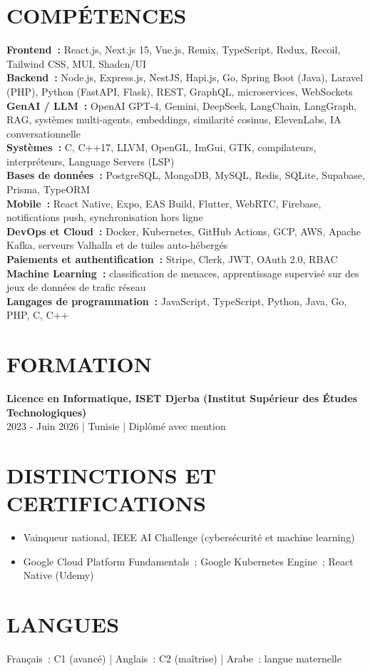 \section{COMPÉTENCES}
\textbf{Frontend~:} React.js, Next.js 15, Vue.js, Remix, TypeScript, Redux, Recoil, Tailwind CSS, MUI, Shadcn/UI\\
\textbf{Backend~:} Node.js, Express.js, NestJS, Hapi.js, Go, Spring Boot (Java), Laravel (PHP), Python (FastAPI, Flask), REST, GraphQL, microservices, WebSockets\\
\textbf{GenAI / LLM~:} OpenAI GPT-4, Gemini, DeepSeek, LangChain, LangGraph, RAG, systèmes multi-agents, embeddings, similarité cosinus, ElevenLabs, IA conversationnelle\\
\textbf{Systèmes~:} C, C++17, LLVM, OpenGL, ImGui, GTK, compilateurs, interpréteurs, Language Servers (LSP)\\
\textbf{Bases de données~:} PostgreSQL, MongoDB, MySQL, Redis, SQLite, Supabase, Prisma, TypeORM\\
\textbf{Mobile~:} React Native, Expo, EAS Build, Flutter, WebRTC, Firebase, notifications push, synchronisation hors ligne\\
\textbf{DevOps et Cloud~:} Docker, Kubernetes, GitHub Actions, GCP, AWS, Apache Kafka, serveurs Valhalla et de tuiles auto-hébergés\\
\textbf{Paiements et authentification~:} Stripe, Clerk, JWT, OAuth 2.0, RBAC\\
\textbf{Machine Learning~:} classification de menaces, apprentissage supervisé sur des jeux de données de trafic réseau\\
\textbf{Langages de programmation~:} JavaScript, TypeScript, Python, Java, Go, PHP, C, C++

\section{FORMATION}
\textbf{Licence en Informatique, ISET Djerba (Institut Supérieur des Études Technologiques)}\\
2023 - Juin 2026 | Tunisie | Diplômé avec mention

\section{DISTINCTIONS ET CERTIFICATIONS}
\begin{itemize}
  \item Vainqueur national, IEEE AI Challenge (cybersécurité et machine learning)
  \item Google Cloud Platform Fundamentals~; Google Kubernetes Engine~; React Native (Udemy)
\end{itemize}

\section{LANGUES}
Français~: C1 (avancé) | Anglais~: C2 (maîtrise) | Arabe~: langue maternelle

